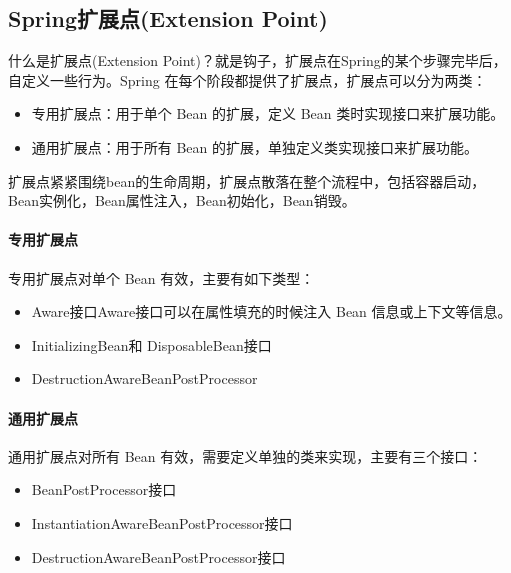 \documentclass[../../../interview-questions.tex]{subfiles}
\begin{document}
\subsection{Spring扩展点(Extension Point)}

什么是扩展点(Extension Point)？就是钩子，扩展点在Spring的某个步骤完毕后，自定义一些行为。Spring 在每个阶段都提供了扩展点，扩展点可以分为两类：

\begin{itemize}
    \item {专用扩展点：用于单个 Bean 的扩展，定义 Bean 类时实现接口来扩展功能。}
    \item {通用扩展点：用于所有 Bean 的扩展，单独定义类实现接口来扩展功能。}
\end{itemize}

扩展点紧紧围绕bean的生命周期，扩展点散落在整个流程中，包括容器启动，Bean实例化，Bean属性注入，Bean初始化，Bean销毁。

\paragraph{专用扩展点}

专用扩展点对单个 Bean 有效，主要有如下类型：

\begin{itemize}
    \item {Aware接口}Aware接口可以在属性填充的时候注入 Bean 信息或上下文等信息。
    \item {InitializingBean和 DisposableBean接口}
    \item {DestructionAwareBeanPostProcessor}
\end{itemize}

\paragraph{通用扩展点}

通用扩展点对所有 Bean 有效，需要定义单独的类来实现，主要有三个接口：

\begin{itemize}
    \item {BeanPostProcessor接口}
    \item {InstantiationAwareBeanPostProcessor接口}
    \item {DestructionAwareBeanPostProcessor接口}
\end{itemize}
\end{document}
